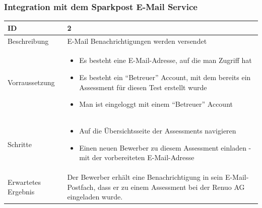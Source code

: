 \subsubsection{Integration mit dem Sparkpost E-Mail Service}
\begin{tabularx}{\textwidth}[H]{|s|X|}
    \hline
    ID                  & 2 \\
    \hline

    Beschreibung        &
    E-Mail Benachrichtigungen werden versendet
    \\ \hline

    Vorraussetzung      &
    \begin{itemize}
        \item Es besteht eine E-Mail-Adresse, auf die man Zugriff hat
        \item Es besteht ein \enquote{Betreuer} Account, mit dem bereits ein Assessment für diesen Test erstellt wurde
        \item Man ist eingeloggt mit einem \enquote{Betreuer} Account
    \end{itemize}
    \\ \hline

    Schritte            &
    \begin{itemize}
        \item Auf die Übersichtsseite der Assessments navigieren
        \item Einen neuen Bewerber zu diesem Assessment einladen - mit der vorbereiteten E-Mail-Adresse
    \end{itemize}
    \\ \hline

    Erwartetes Ergebnis &
    Der Bewerber erhält eine Benachrichtigung in sein E-Mail-Postfach, dass er zu einem Assessment bei der Renuo AG eingeladen wurde.
    \\ \hline
\end{tabularx}

